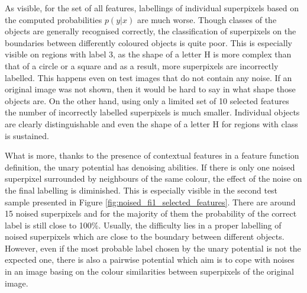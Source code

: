 As visible, for the set of all features, labellings of individual superpixels based on the computed probabilities $p(y|x)$ are much worse. Though classes of the objects are generally recognised correctly, the classification of superpixels on the boundaries between differently coloured objects is quite poor. This is especially visible on regions with label 3, as the shape of a letter H is more complex than that of a circle or a square and as a result, more superpixels are incorrectly labelled. This happens even on test images that do not contain any noise. If an original image was not shown, then it would be hard to say in what shape those objects are. On the other hand, using only a limited set of 10 selected features the number of incorrectly labelled superpixels is much smaller. Individual objects are clearly distinguishable and even the shape of a letter H for regions with  class is sustained.

What is more, thanks to the presence of contextual features in a feature function definition, the unary potential has denoising abilities. If there is only one noised superpixel surrounded by neighbours of the same colour, the effect of the noise on the final labelling is diminished. This is especially visible in the second test sample presented in Figure \ref{fig:noised_fi1_selected_features}. There are around 15 noised superpixels and for the majority of them the probability of the correct label is still close to 100\%. Usually, the difficulty lies in a proper labelling of noised superpixels which are close to the boundary between different objects. However, even if the most probable label chosen by the unary potential is not the expected one, there is also a pairwise potential which aim is to cope with noises in an image basing on the colour similarities between superpixels of the original image.

